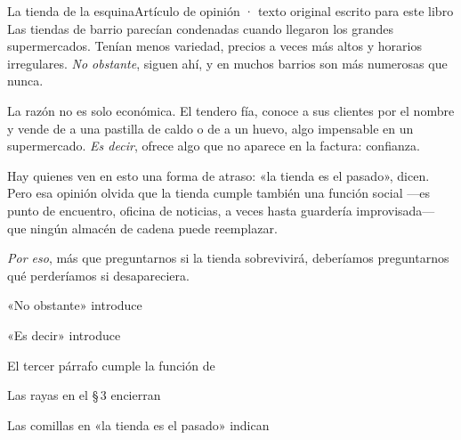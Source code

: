 \evaluacion
\begin{texto}{La tienda de la esquina}{Artículo de opinión · texto original escrito para este libro}
\pa Las tiendas de barrio parecían condenadas cuando llegaron los grandes supermercados. Tenían menos variedad, precios a
veces más altos y horarios irregulares. \emph{No obstante}, siguen ahí, y en muchos barrios son más numerosas que nunca.

\pa La razón no es solo económica. El tendero fía, conoce a sus clientes por el nombre y vende de a una pastilla de caldo o
de a un huevo, algo impensable en un supermercado. \emph{Es decir}, ofrece algo que no aparece en la factura: confianza.

\pa Hay quienes ven en esto una forma de atraso: «la tienda es el pasado», dicen. Pero esa opinión olvida que la tienda
cumple también una función social —es punto de encuentro, oficina de noticias, a veces hasta guardería improvisada— que
ningún almacén de cadena puede reemplazar.

\pa \emph{Por eso}, más que preguntarnos si la tienda sobrevivirá, deberíamos preguntarnos qué perderíamos si
desapareciera.
\end{texto}
\begin{ejercicios}
\item «No obstante»  introduce
\item «Es decir»  introduce
\item El tercer párrafo cumple la función de
\item Las rayas en el \S\,3 encierran
\item Las comillas en «la tienda es el pasado»  indican
\end{ejercicios}
